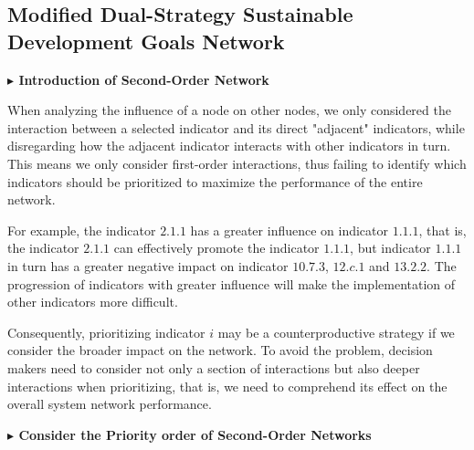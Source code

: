 \documentclass[12pt]{article}  %
\begin{document}
\subsection{Modified Dual-Strategy Sustainable Development Goals Network}

\vspace{0.7mm}\begin{itshape}
\textbf{$\blacktriangleright$ Introduction of Second-Order Network}\end{itshape}

When analyzing the influence of a node on other nodes, we only considered the interaction between a selected indicator and its direct "adjacent" indicators, while disregarding how the adjacent indicator interacts with other indicators in turn. This means we only consider first-order interactions, thus failing to identify which indicators should be prioritized to maximize the performance of the entire network.


For example, the  indicator $2.1.1$ has a greater influence on  indicator $1.1.1$, that is, the  indicator $2.1.1$ can effectively promote the  indicator $1.1.1$, but indicator $1.1.1$ in turn has a greater negative impact on  indicator $10.7.3$, $12.c.1$ and $13.2.2$. The progression of indicators with greater influence will make the implementation of other indicators more difficult. 

Consequently, prioritizing indicator $i$ may be a counterproductive strategy if we consider the broader impact on the network. To avoid the problem, decision makers need to consider not only a section of interactions but also deeper interactions when prioritizing, that is, we need to comprehend its effect on the overall system network performance.


\vspace{0.7mm}\begin{itshape}
\textbf{$\blacktriangleright$ Consider the Priority order of Second-Order Networks}\end{itshape}
\end{document}
